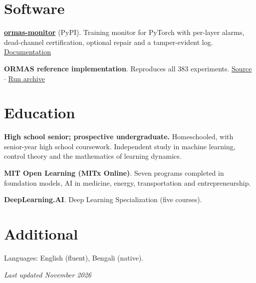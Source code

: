 \documentclass[10pt,a4paper]{article}
\newcommand{\cvitem}[3]{%
  \begin{list}{}{%
    \setlength{\leftmargin}{2.35cm}%
    \setlength{\labelwidth}{2.1cm}%
    \setlength{\labelsep}{0.25cm}%
    \setlength{\itemindent}{0pt}%
    \setlength{\listparindent}{0pt}%
    \setlength{\rightmargin}{0pt}%
    \setlength{\topsep}{0pt}%
    \setlength{\partopsep}{0pt}%
    \setlength{\parsep}{0pt}%
    \setlength{\itemsep}{0pt}%
  }%
  \item[{\makebox[2.1cm][l]{\footnotesize\color{muted}#1}}]%
  #2
  #3
  \end{list}%
  \vspace{1.5pt}
}
\begin{document}
\section*{Software}
\cvitem{2026}{\textbf{\href{https://pypi.org/project/ormas-monitor/}{ormas-monitor}} (PyPI). Training monitor for PyTorch with per-layer alarms, dead-channel certification, optional repair and a tamper-evident log. \href{https://oxiedo.github.io/ormas-monitor/}{Documentation}}{}
\cvitem{2026}{\textbf{ORMAS reference implementation}. Reproduces all 383 experiments. \href{https://anonymous.4open.science/r/ormas-EB73/README.md}{Source} $\cdot$ \href{https://drive.google.com/file/d/1CDaMIpTZ_8Mkot9D-O7JU29mDopq_Bdl/view}{Run archive}}{}

\section*{Education}
\cvitem{present}{\textbf{High school senior; prospective undergraduate.} Homeschooled, with senior-year high school coursework. Independent study in machine learning, control theory and the mathematics of learning dynamics.}{}
\cvitem{2025--2026}{\textbf{MIT Open Learning (MITx Online)}. Seven programs completed in foundation models, AI in medicine, energy, transportation and entrepreneurship.}{}
\cvitem{2025--2026}{\textbf{DeepLearning.AI}. Deep Learning Specialization (five courses).}{}

\section*{Additional}
\cvitem{}{Languages: English (fluent), Bengali (native).}{}

\vfill
\begin{flushright}
  \footnotesize\color{muted}\textit{Last updated November 2026}
\end{flushright}
\end{document}
